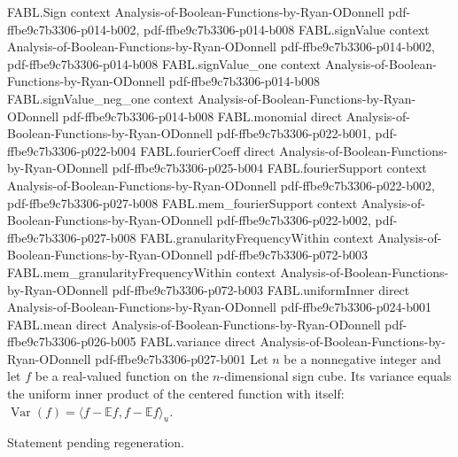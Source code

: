 \begin{theorem}
\label{FABL.variance_eq_uniformInner_centered}
\leanok
{}
\proofstep
  {FABL.Sign}
  {context}
  {Analysis-of-Boolean-Functions-by-Ryan-ODonnell}
  {pdf-ffbe9c7b3306-p014-b002,
    pdf-ffbe9c7b3306-p014-b008}
\proofstep
  {FABL.signValue}
  {context}
  {Analysis-of-Boolean-Functions-by-Ryan-ODonnell}
  {pdf-ffbe9c7b3306-p014-b002,
    pdf-ffbe9c7b3306-p014-b008}
\proofstep
  {FABL.signValue_one}
  {context}
  {Analysis-of-Boolean-Functions-by-Ryan-ODonnell}
  {pdf-ffbe9c7b3306-p014-b008}
\proofstep
  {FABL.signValue_neg_one}
  {context}
  {Analysis-of-Boolean-Functions-by-Ryan-ODonnell}
  {pdf-ffbe9c7b3306-p014-b008}
\proofstep
  {FABL.monomial}
  {direct}
  {Analysis-of-Boolean-Functions-by-Ryan-ODonnell}
  {pdf-ffbe9c7b3306-p022-b001,
    pdf-ffbe9c7b3306-p022-b004}
\proofstep
  {FABL.fourierCoeff}
  {direct}
  {Analysis-of-Boolean-Functions-by-Ryan-ODonnell}
  {pdf-ffbe9c7b3306-p025-b004}
\proofstep
  {FABL.fourierSupport}
  {context}
  {Analysis-of-Boolean-Functions-by-Ryan-ODonnell}
  {pdf-ffbe9c7b3306-p022-b002,
    pdf-ffbe9c7b3306-p027-b008}
\proofstep
  {FABL.mem_fourierSupport}
  {context}
  {Analysis-of-Boolean-Functions-by-Ryan-ODonnell}
  {pdf-ffbe9c7b3306-p022-b002,
    pdf-ffbe9c7b3306-p027-b008}
\proofstep
  {FABL.granularityFrequencyWithin}
  {context}
  {Analysis-of-Boolean-Functions-by-Ryan-ODonnell}
  {pdf-ffbe9c7b3306-p072-b003}
\proofstep
  {FABL.mem_granularityFrequencyWithin}
  {context}
  {Analysis-of-Boolean-Functions-by-Ryan-ODonnell}
  {pdf-ffbe9c7b3306-p072-b003}
\proofstep
  {FABL.uniformInner}
  {direct}
  {Analysis-of-Boolean-Functions-by-Ryan-ODonnell}
  {pdf-ffbe9c7b3306-p024-b001}
\proofstep
  {FABL.mean}
  {direct}
  {Analysis-of-Boolean-Functions-by-Ryan-ODonnell}
  {pdf-ffbe9c7b3306-p026-b005}
\proofstep
  {FABL.variance}
  {direct}
  {Analysis-of-Boolean-Functions-by-Ryan-ODonnell}
  {pdf-ffbe9c7b3306-p027-b001}
Let $n$ be a nonnegative integer and let $f$ be a real-valued function on the
$n$-dimensional sign cube. Its variance equals the uniform inner product of the centered
function with itself: $\operatorname{Var}(f)=\langle f-\mathbb{E}f,
f-\mathbb{E}f\rangle_u$.
\end{theorem}

\begin{theorem}
\label{FABL.variance_eq_sum_sq_fourierCoeff}
\leanok
{}
Statement pending regeneration.
\end{theorem}

